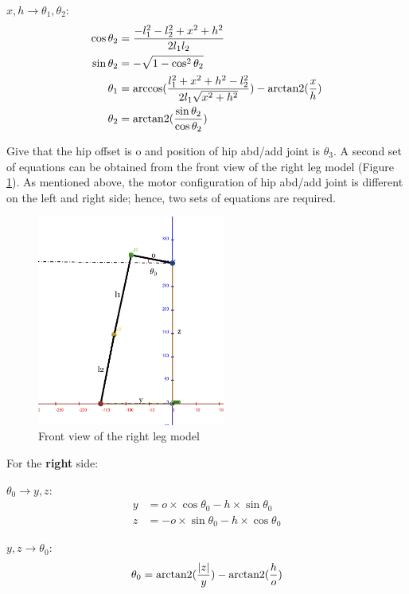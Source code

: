$x, h \rightarrow \theta_1, \theta_2$:
\begin{align*}
\cos\theta_2 &= \frac{-l_1^2 - l_2^2 + x^2 + h^2}{2 l_1 l_2} \\
\sin\theta_2 &= -\sqrt{1 - \cos^2\theta_2} \\
\theta_1 &= \arccos(\frac{l_1^2 + x^2 + h^2 - l_2^2}{2 l_1 \sqrt{x^2 + h^2}}) - \operatorname{arctan2}(\frac{x}{h}) \\
\theta_2 &= \operatorname{arctan2}(\frac{\sin\theta_2}{\cos\theta_2})
\end{align*}

Give that the hip offset is o and position of hip abd/add joint is $\theta_3$. A second set of equations can be obtained from the front view of the right leg model (Figure \ref{fig:right_leg_model_front_view}). As mentioned above, the motor configuration of hip abd/add joint is different on the left and right side; hence, two sets of equations are required.

\begin{figure}[htbp]
   \centering
   \includegraphics[width=0.55\textwidth]{figures/right_leg_model_front_view.jpg}
   \caption{Front view of the right leg model}
   \label{fig:right_leg_model_front_view}
\end{figure}

For the \textbf{right} side:

\indent\indent
$\theta_0 \rightarrow y, z$:
\begin{align*}
y &=  o \times \cos\theta_0 - h \times \sin\theta_0 \\
z &= -o \times \sin\theta_0 - h \times \cos\theta_0
\end{align*}

\indent\indent
$y, z \rightarrow \theta_0$:
\begin{equation*}
   \theta_0 = \operatorname{arctan2}(\frac{\lvert z \lvert}{y}) - \operatorname{arctan2}(\frac{h}{o})
\end{equation*}

